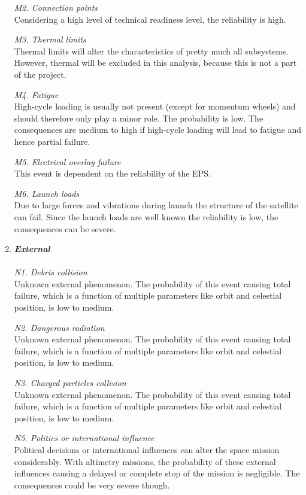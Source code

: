 \begin{enumerate}[A]
\textit{M2. Connection points}\\ 
Considering a high level of technical readiness level, the reliability is high.

\textit{M3. Thermal limits}\\ 
Thermal limits will alter the characteristics of pretty much all subsystems. However, thermal will be excluded in this analysis, because this is not a part of the project. 

\textit{M4. Fatigue}\\ 
High-cycle loading is usually not present (except for momentum wheels) and should therefore only play a minor role. The probability is low. The consequences are medium to high if high-cycle loading will lead to fatigue and hence partial failure.

\textit{M5. Electrical overlay failure}\\ 
This event is dependent on the reliability of the EPS.

\textit{M6. Launch loads} \\
Due to large forces and vibrations during launch the structure of the satellite can fail. Since the launch loads are well known the reliability is low, the consequences can be severe.

	\item\textbf{\textit{External}} \\\\
\textit{N1. Debris collision}\\ 
Unknown external phenomenon. The probability of this event causing total failure, which is a function of multiple parameters like orbit and celestial position, is low to medium. 

\textit{N2. Dangerous radiation}\\ 
Unknown external phenomenon. The probability of this event causing total failure, which is a function of multiple parameters like orbit and celestial position, is low to medium. 

\textit{N3. Charged particles collision}\\ 
Unknown external phenomenon. The probability of this event causing total failure, which is a function of multiple parameters like orbit and celestial position, is low to medium. 

\textit{N5. Politics or international influence}\\ 
Political decisions or international influences can alter the space mission considerably.  With altimetry missions, the probability of these external influences causing a delayed or complete stop of the mission is negligible. The consequences could be very severe though. 


\end{enumerate}
